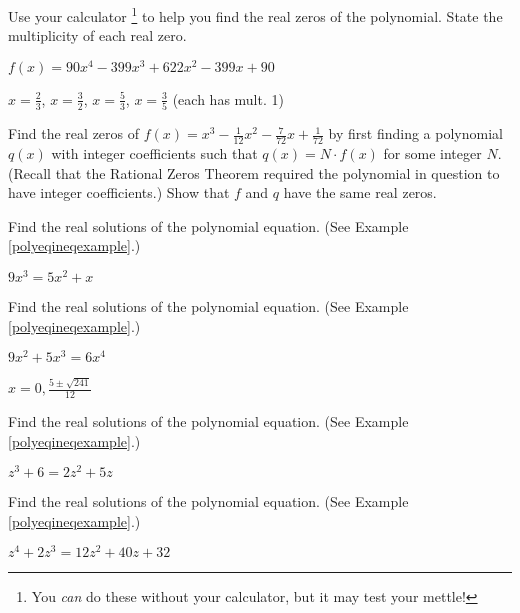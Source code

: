 \documentclass{ximera}
\begin{document}
\begin{problem}\label{realzeroswcalclast}
Use your calculator \footnote{You \textit{can} do these without your calculator, but it may test your mettle!} to help you find the real zeros of the polynomial.  State the multiplicity of each real zero.

$f(x) = 90x^{4} - 399x^{3} + 622x^{2} - 399x + 90$

\begin{solution}
$x = \frac{2}{3}$, $x = \frac{3}{2}$, $x = \frac{5}{3}$, $x = \frac{3}{5}$ (each has mult. 1)
\end{solution}
\end{problem}

\begin{problem}
Find the real zeros of $f(x) = x^{3} - \frac{1}{12}x^{2} - \frac{7}{72}x + \frac{1}{72}$ by first finding a polynomial $q(x)$ with integer coefficients such that $q(x) = N \cdot f(x)$ for some integer $N$.  (Recall that the Rational Zeros Theorem required the polynomial in question to have integer coefficients.) Show that $f$ and $q$ have the same real zeros.
\end{problem}

\begin{problem}\label{polyequexerfirst}
Find the real solutions of the polynomial equation.  (See Example \ref{polyeqineqexample}.)

$9x^{3} = 5x^{2} + x$ 
\end{problem}
  
\begin{problem}
Find the real solutions of the polynomial equation.  (See Example \ref{polyeqineqexample}.)

$9x^{2}+5x^{3}= 6x^{4}$ 

\begin{solution}
$x = 0, \frac{5 \pm \sqrt{241}}{12}$
\end{solution}
\end{problem} 

\begin{problem}
Find the real solutions of the polynomial equation.  (See Example \ref{polyeqineqexample}.)

$z^{3} + 6 = 2z^{2} + 5z$ 
\end{problem} 

\begin{problem}
Find the real solutions of the polynomial equation.  (See Example \ref{polyeqineqexample}.)

$z^{4} + 2z^{3} = 12z^{2} + 40z + 32$ 
\end{problem} 
\end{document}
